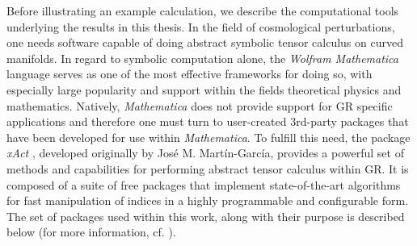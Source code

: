 Before illustrating an example calculation, we describe the computational tools underlying the results in this thesis. In the field of cosmological perturbations, one needs software capable of doing abstract symbolic tensor calculus on curved manifolds. In regard to symbolic computation alone, the \textit{Wolfram Mathematica} language serves as one of the most effective frameworks for doing so, with especially large popularity and support within the fields theoretical physics and mathematics. Natively, \textit{Mathematica} does not provide support for GR specific applications and therefore one must turn to user-created 3rd-party packages that have been developed for use within \textit{Mathematica}. To fulfill this need, the package \textit{xAct} \cite{garcia_2002}, developed originally by José M. Martín-García, provides a powerful set of methods and capabilities for performing abstract tensor calculus within GR. It is composed of a suite of free packages that implement state-of-the-art algorithms for fast manipulation of indices in a highly programmable and configurable form. The set of packages used within this work, along with their purpose is described below (for more information, cf. \cite{garcia_2002}). 

